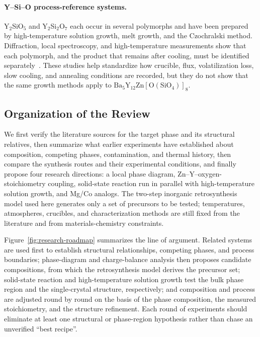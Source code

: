\paragraph{Y--Si--O process-reference systems.}
Y$_2$SiO$_5$ and Y$_2$Si$_2$O$_7$ each occur in several polymorphs and have been prepared by high-temperature solution growth, melt growth, and the Czochralski method. Diffraction, local spectroscopy, and high-temperature measurements show that each polymorph, and the product that remains after cooling, must be identified separately~\cite{redhammer2003beta,becerro2004revisiting,dolan2008structures,pang2005study}. These studies help standardize how crucible, flux, volatilization loss, slow cooling, and annealing conditions are recorded, but they do not show that the same growth methods apply to $\mathrm{Ba_5Y_{12}Zn[O(SiO_4)]_8}$.

\subsection{Organization of the Review}

We first verify the literature sources for the target phase and its structural relatives, then summarize what earlier experiments have established about composition, competing phases, contamination, and thermal history, then compare the synthesis routes and their experimental conditions, and finally propose four research directions: a local phase diagram, Zn--Y--oxygen-stoichiometry coupling, solid-state reaction run in parallel with high-temperature solution growth, and Mg\slash Co analogs. The two-step inorganic retrosynthesis model used here generates only a set of precursors to be tested; temperatures, atmospheres, crucibles, and characterization methods are still fixed from the literature and from materials-chemistry constraints.

Figure~\ref{fig:research-roadmap} summarizes the line of argument. Related systems are used first to establish structural relationships, competing phases, and process boundaries; phase-diagram and charge-balance analysis then proposes candidate compositions, from which the retrosynthesis model derives the precursor set; solid-state reaction and high-temperature solution growth test the bulk phase region and the single-crystal structure, respectively; and composition and process are adjusted round by round on the basis of the phase composition, the measured stoichiometry, and the structure refinement. Each round of experiments should eliminate at least one structural or phase-region hypothesis rather than chase an unverified ``best recipe''.

